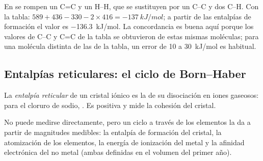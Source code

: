 \begin{example}\label{ex:b2:reaction-enthalpy:hydrogenation}
En  se rompen un C=C y un H--H, que se
sustituyen por un C--C y dos C--H. Con la tabla: $589 + 436 - 330 - 2
\times 416 = \qty{-137}{kJ/mol}$; a partir de las entalpías de formación el valor es
\qty{-136.3}{kJ/mol}. La concordancia es buena aquí porque los valores de C--C
y C=C de la tabla se obtuvieron de estas mismas moléculas; para una molécula distinta
de las de la tabla, un error de 10 a \qty{30}{kJ/mol} es habitual.
\end{example}

\subsection*{Entalpías reticulares: el ciclo de Born--Haber}

\begin{definition}\label{def:b2:reaction-enthalpy:lattice-enthalpy}
La \emph{entalpía reticular} de un cristal iónico es
la  de su disociación en iones gaseosos: para
el cloruro de sodio, . Es positiva y
mide la cohesión del cristal.
\end{definition}

No puede medirse directamente, pero un ciclo a través de los elementos la da
a partir de magnitudes medibles: la entalpía de formación del cristal, la
atomización de los elementos, la energía de ionización del metal y la
afinidad electrónica del no metal (ambas definidas en el volumen del primer año).

